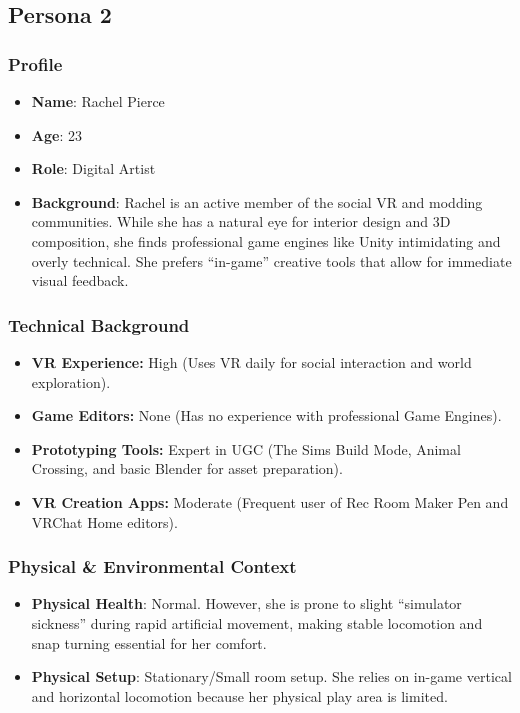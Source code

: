 \documentclass[inscr,ack,preface]{dithesis}
\begin{document}
\subsection{Persona 2}

\subsubsection{Profile}

\begin{itemize}
  \item \textbf{Name}: Rachel Pierce
  \item \textbf{Age}: 23
  \item \textbf{Role}: Digital Artist
  \item \textbf{Background}: Rachel is an active member of the social VR and modding communities.
        While she has a natural eye for interior design and 3D composition, she finds professional game engines
        like Unity intimidating and overly technical. She prefers ``in-game'' creative tools that allow for immediate visual feedback.
\end{itemize}

\subsubsection{Technical Background}

\begin{itemize}
  \item \textbf{VR Experience:} High (Uses VR daily for social interaction and world exploration).
  \item \textbf{Game Editors:} None (Has no experience with professional Game Engines).
  \item \textbf{Prototyping Tools:} Expert in UGC (The Sims Build Mode, Animal Crossing, and basic Blender for asset preparation).
  \item \textbf{VR Creation Apps:} Moderate (Frequent user of Rec Room Maker Pen and VRChat Home editors).
\end{itemize}

\subsubsection{Physical \& Environmental Context}

\begin{itemize}
  \item \textbf{Physical Health}: Normal. However, she is prone to slight ``simulator sickness'' during rapid artificial movement,
        making stable locomotion and snap turning essential for her comfort.
  \item \textbf{Physical Setup}: Stationary/Small room setup. She relies on in-game vertical and horizontal
        locomotion because her physical play area is limited.
\end{itemize}
\end{document}
